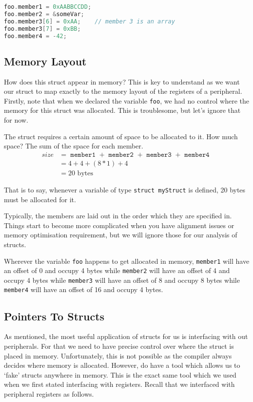 \begin{lstlisting}[language=C]
foo.member1 = 0xAABBCCDD;
foo.member2 = &someVar;
foo.member3[6] = 0xAA;    // member 3 is an array
foo.member3[7] = 0xBB;
foo.member4 = -42;
\end{lstlisting}

\subsection{Memory Layout}
How does this struct appear in memory? This is key to understand as we want our struct to map exactly to the memory layout of the registers of a peripheral. 
Firstly, note that when we declared the variable \texttt{foo}, we had no control where the memory for this struct was allocated. This is troublesome, but let's ignore that for now.

The struct requires a certain amount of space to be allocated to it. How much space? The sum of the space for each member. 
\begin{align*}
size &= \texttt{ member1 } + \texttt{ member2 } + \texttt{ member3 } + \texttt{ member4 }\\
 &= 4 + 4 + (8*1) + 4\\
 &= 20 \text{ bytes}
\end{align*}

That is to say, whenever a variable of type \texttt{struct myStruct} is defined, 20 bytes must be allocated for it. 

Typically, the members are laid out in the order which they are specified in. Things start to become more complicated when you have alignment issues or memory optimisation requirement, but we will ignore those for our analysis of structs. 

Wherever the variable \texttt{foo} happens to get allocated in memory, \texttt{member1} will have an offset of 0 and occupy 4 bytes while \texttt{member2} will have an offset of 4 and occupy 4 bytes while \texttt{member3} will have an offset of 8 and occupy 8 bytes while \texttt{member4} will have an offset of 16 and occupy 4 bytes. 

\subsection{Pointers To Structs}
As mentioned, the most useful application of structs for us is interfacing with out peripherals. For that we need to have precise control over where the struct is placed in memory. Unfortunately, this is not possible as the compiler always decides where memory is allocated. 
However, do have a tool which allows us to `fake' structs anywhere in memory. This is the exact same tool which we used when we first stated interfacing with registers.
Recall that we interfaced with peripheral registers as follows.

